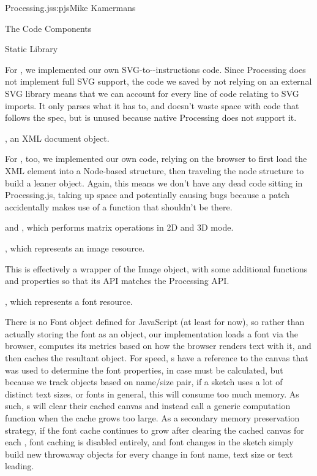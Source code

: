 \begin{aosachapter}{Processing.js}{s:pjs}{Mike Kamermans}
\begin{aosasect1}{The Code Components}
\begin{aosasect2}{Static Library}
\begin{aosaitemize}
For , we implemented our own
SVG-to--instructions code. Since
Processing does not implement full SVG support, the code we saved by
not relying on an external SVG library means that we can account for
every line of code relating to SVG imports. It only parses what it has
to, and doesn't waste space with code that follows the spec, but is
unused because native Processing does not support it.

\item {}, an XML document object.

For , too, we implemented our own code, relying on the
browser to first load the XML element into a Node-based structure,
then traveling the node structure to build a leaner object. Again,
this means we don't have any dead code sitting in Processing.js,
taking up space and potentially causing bugs because a patch
accidentally makes use of a function that shouldn't be there.

\item {} and , which performs matrix operations in 2D and 3D
  mode.

\item {}, which represents an image resource.

This is effectively a wrapper of the Image object, with some
additional functions and properties so that its API matches the
Processing API.

\item {}, which represents a font resource.

There is no Font object defined for JavaScript (at least for now), so
rather than actually storing the font as an object, our 
implementation loads a font via the browser, computes its metrics
based on how the browser renders text with it, and then caches the
resultant  object. For speed, s have a reference to the
canvas that was used to determine the font properties, in case
 must be calculated, but because we track  objects based
on name/size pair, if a sketch uses a lot of distinct text sizes, or
fonts in general, this will consume too much memory. As such, s
will clear their cached canvas and instead call a generic 
computation function when the cache grows too large. As a secondary
memory preservation strategy, if the font cache continues to grow
after clearing the cached canvas for each , font caching is
disabled entirely, and font changes in the sketch simply build new
throwaway  objects for every change in font name, text size or
text leading.


\end{aosaitemize}
\end{aosasect2}
\end{aosasect1}
\end{aosachapter}
